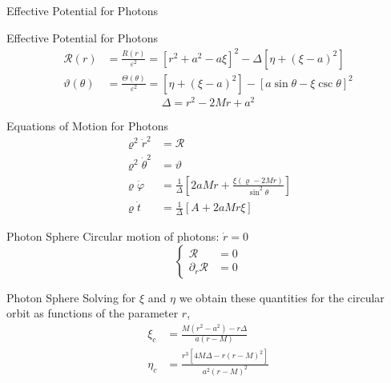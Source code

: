 \documentclass{beamer}
\begin{document}
\begin{darkframes}
\begin{frame}{Effective Potential for Photons}
\end{frame}

\begin{frame}{Effective Potential for Photons}
	\begin{align*}
	\mathcal{R}(r) &= \frac{R(r)}{\varepsilon^2} = \left[ r^2 +a^2  - a \xi  \right]^2 - \Delta \left[\eta + (\xi - a )^2 \right] \\
	\vartheta (\theta) &= \frac{\Theta(\theta)}{\varepsilon^2} = \left[\eta + (\xi - a )^2 \right] - \left[ a \sin \theta - \xi \csc \theta \right]^2
	\end{align*} 
	\pause 
	\[\Delta = r^{2}-2Mr+a^{2} \] 
\end{frame}

\begin{frame}{Equations of Motion for Photons}
	\begin{align*}
    \varrho^2 \dot{r}^2 &= \mathcal{R} \\
    \varrho^2 \dot{\theta}^2 &= \vartheta \\
    \varrho \dot{\varphi} &= \frac{1}{\Delta} \left[ 2aMr + \frac{\xi (\varrho - 2Mr)}{\sin^2 \theta} \right] \\
    \varrho \dot{t} &= \frac{1}{\Delta} \left[ A + 2aMr \xi \right]
    \end{align*}
\end{frame}

\begin{frame}{Photon Sphere}
	Circular motion of photons: $\dot{r} = 0$
	\pause
	\[\begin{cases}
	\mathcal{R} &= 0\\
	\partial_r \mathcal{R} &= 0
	\end{cases}\]
\end{frame}

\begin{frame}{Photon Sphere}
	Solving for $\xi$ and $\eta$ we obtain these quantities for the circular orbit as functions of the parameter $r$,
	\pause
	\begin{align*}
	\xi_{c} &= \frac{M(r^2 -a^2) - r \Delta}{a(r-M)} \\
	\eta_{c} &= \frac{r^3 \left[ 4M\Delta - r (r-M)^2\right]}{a^2(r-M)^2}
	\end{align*}
\end{frame}


\end{darkframes}
\end{document}
